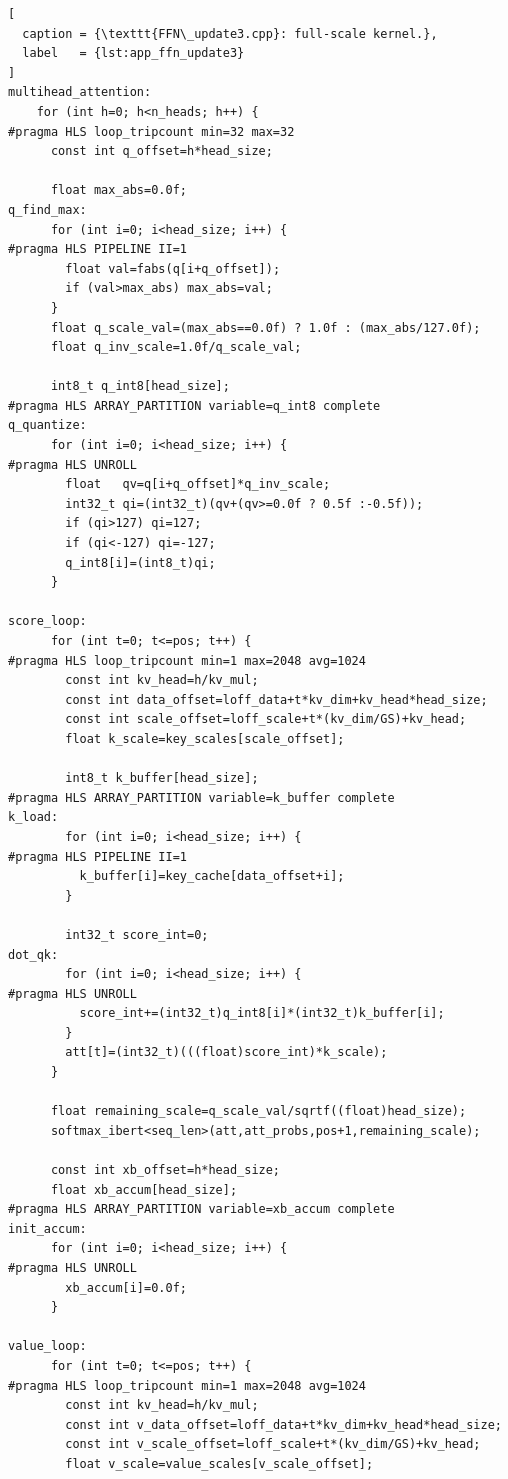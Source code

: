 \begin{appendices}
\begin{lstlisting}[
  caption = {\texttt{FFN\_update3.cpp}: full-scale kernel.},
  label   = {lst:app_ffn_update3}
]
multihead_attention:
    for (int h=0; h<n_heads; h++) {
#pragma HLS loop_tripcount min=32 max=32
      const int q_offset=h*head_size;

      float max_abs=0.0f;
q_find_max:
      for (int i=0; i<head_size; i++) {
#pragma HLS PIPELINE II=1
        float val=fabs(q[i+q_offset]);
        if (val>max_abs) max_abs=val;
      }
      float q_scale_val=(max_abs==0.0f) ? 1.0f : (max_abs/127.0f);
      float q_inv_scale=1.0f/q_scale_val;

      int8_t q_int8[head_size];
#pragma HLS ARRAY_PARTITION variable=q_int8 complete
q_quantize:
      for (int i=0; i<head_size; i++) {
#pragma HLS UNROLL
        float   qv=q[i+q_offset]*q_inv_scale;
        int32_t qi=(int32_t)(qv+(qv>=0.0f ? 0.5f :-0.5f));
        if (qi>127) qi=127;
        if (qi<-127) qi=-127;
        q_int8[i]=(int8_t)qi;
      }

score_loop:
      for (int t=0; t<=pos; t++) {
#pragma HLS loop_tripcount min=1 max=2048 avg=1024
        const int kv_head=h/kv_mul;
        const int data_offset=loff_data+t*kv_dim+kv_head*head_size;
        const int scale_offset=loff_scale+t*(kv_dim/GS)+kv_head;
        float k_scale=key_scales[scale_offset];

        int8_t k_buffer[head_size];
#pragma HLS ARRAY_PARTITION variable=k_buffer complete
k_load:
        for (int i=0; i<head_size; i++) {
#pragma HLS PIPELINE II=1
          k_buffer[i]=key_cache[data_offset+i];
        }

        int32_t score_int=0;
dot_qk:
        for (int i=0; i<head_size; i++) {
#pragma HLS UNROLL
          score_int+=(int32_t)q_int8[i]*(int32_t)k_buffer[i];
        }
        att[t]=(int32_t)(((float)score_int)*k_scale);
      }

      float remaining_scale=q_scale_val/sqrtf((float)head_size);
      softmax_ibert<seq_len>(att,att_probs,pos+1,remaining_scale);

      const int xb_offset=h*head_size;
      float xb_accum[head_size];
#pragma HLS ARRAY_PARTITION variable=xb_accum complete
init_accum:
      for (int i=0; i<head_size; i++) {
#pragma HLS UNROLL
        xb_accum[i]=0.0f;
      }

value_loop:
      for (int t=0; t<=pos; t++) {
#pragma HLS loop_tripcount min=1 max=2048 avg=1024
        const int kv_head=h/kv_mul;
        const int v_data_offset=loff_data+t*kv_dim+kv_head*head_size;
        const int v_scale_offset=loff_scale+t*(kv_dim/GS)+kv_head;
        float v_scale=value_scales[v_scale_offset];


\end{lstlisting}
\end{appendices}
